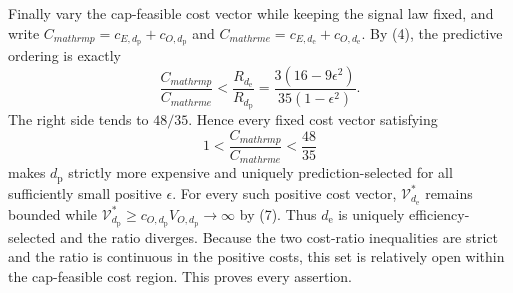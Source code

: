Finally vary the cap-feasible cost vector while keeping the signal law fixed, and write \(C_{mathrm p}=c_{E,d_{\mathrm p}}+c_{O,d_{\mathrm p}}\) and \(C_{mathrm e}=c_{E,d_{\mathrm e}}+c_{O,d_{\mathrm e}}\).  By (4), the predictive ordering is exactly
\[
 \frac{C_{mathrm p}}{C_{mathrm e}}
 <\frac{R_{d_{\mathrm e}}}{R_{d_{\mathrm p}}}
 =\frac{3(16-9\epsilon^2)}{35(1-\epsilon^2)}. \tag{11}
\]
The right side tends to \(48/35\).  Hence every fixed cost vector satisfying
\[
 1<\frac{C_{mathrm p}}{C_{mathrm e}}<\frac{48}{35}
\]
makes \(d_{\mathrm p}\) strictly more expensive and uniquely prediction-selected for all sufficiently small positive \(\epsilon\).  For every such positive cost vector, \(\mathcal V_{d_{\mathrm e}}^*\) remains bounded while \(\mathcal V_{d_{\mathrm p}}^*\ge c_{O,d_{\mathrm p}}V_{O,d_{\mathrm p}}\to\infty\) by (7).  Thus \(d_{\mathrm e}\) is uniquely efficiency-selected and the ratio diverges.  Because the two cost-ratio inequalities are strict and the ratio is continuous in the positive costs, this set is relatively open within the cap-feasible cost region.  This proves every assertion.